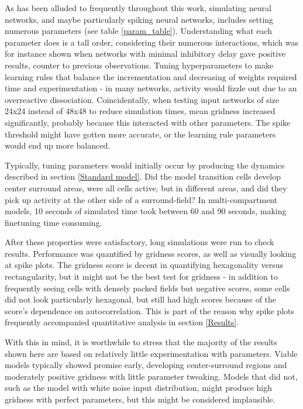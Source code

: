 \documentclass{article}
\begin{document}
    As has been alluded to frequently throughout this work, simulating neural networks, and maybe particularly spiking neural networks, includes setting numerous parameters (see table \ref{param_table}). Understanding what each parameter does is a tall order, considering their numerous interactions, which was for instance shown when networks with minimal inhibitory delay gave positive results, counter to previous observations. Tuning hyperparameters to make learning rules that balance the incrementation and decreasing of weights required time and experimentation - in many networks, activity would fizzle out due to an overreactive dissociation. Coincidentally, when testing input networks of size 24x24 instead of 48x48 to reduce simulation times, mean gridness increased significantly, probably because this interacted with other parameters. The spike threshold might have gotten more accurate, or the learning rule parameters would end up more balanced.

    Typically, tuning parameters would initially occur by producing the dynamics described in section \ref{Standard model}. Did the model transition cells develop center surround areas, were all cells active, but in different areas, and did they pick up activity at the other side of a surround-field? In multi-compartment models, 10 seconds of simulated time took between 60 and 90 seconds, making finetuning time consuming.
    
    After these properties were satisfactory, long simulations were run to check results. Performance was quantified by gridness scores, as well as visually looking at spike plots. The gridness score is decent in quantifying hexagonality versus rectangularity, but it might not be the best test for gridness - in addition to frequently seeing cells with densely packed fields but negative scores, some cells did not look particularly hexagonal, but still had high scores because of the score's dependence on autocorrelation. This is part of the reason why spike plots frequently accompanied quantitative analysis in section \ref{Results}.

    With this in mind, it is worthwhile to stress that the majority of the results shown here are based on relatively little experimentation with parameters. Viable models typically showed promise early, developing center-surround regions and moderately positive gridness with little parameter tweaking. Models that did not, such as the model with white noise input distribution, might produce high gridness with perfect parameters, but this might be considered implausible.
\end{document}
